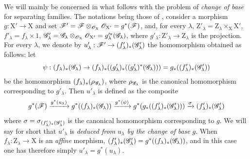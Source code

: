 \begin{env}[11.9.5]
\label{IV.11.9.5}
We will mainly be concerned in what follows with the problem of \emph{change of base} for separating families.
The notations being those of , consider a morphism $g:\mathrm{X}'\to\mathrm{X}$ and set $\mathscr{F}'=\mathscr{F}\otimes_{\mathscr{O}_\mathrm{X}}\mathscr{O}_{\mathrm{X}'}=g^*(\mathscr{F})$, and, for every $\lambda$, $\mathrm{Z}'_\lambda=\mathrm{Z}_\lambda\times_\mathrm{X}\mathrm{X}'$, $f'_\lambda=f_\lambda\times 1$, $\mathscr{G}'_\lambda=\mathscr{G}_\lambda\otimes_{\mathscr{O}_\mathrm{X}}\mathscr{O}_{\mathrm{X}'}=g'^*_\lambda(\mathscr{G}_\lambda)$, where $g'_\lambda:\mathrm{Z}'_\lambda\to\mathrm{Z}_\lambda$ is the projection.
For every $\lambda$, we denote by $u'_\lambda:\mathscr{F}'\to(f'_\lambda)_*(\mathscr{G}'_\lambda)$ the homomorphism obtained as follows: let
\[
  \psi:(f_\lambda)_*(\mathscr{G}_\lambda)\to(f_\lambda)_*((g'_\lambda)_*((g'_\lambda)^*(\mathscr{G}_\lambda)))=g_*((f'_\lambda)_*(\mathscr{G}'_\lambda))
\]
be the homomorphism $(f_\lambda)_*(\rho_{\mathscr{G}_\lambda})$, where $\rho_{\mathscr{G}_\lambda}$ is the canonical homomorphism  corresponding to $g'_\lambda$.
Then $u'_\lambda$ is defined as the composite
\[
  g^*(\mathscr{F})\xrightarrow{g^*(u_\lambda)}g^*((f_\lambda)_*(\mathscr{G}_\lambda))\xrightarrow{g^*(\psi)}g^*(g_*((f'_\lambda)_*(\mathscr{G}'_\lambda)))\xrightarrow{\sigma}(f'_\lambda)_*(\mathscr{G}'_\lambda)
\]
where $\sigma=\sigma_{(f'_\lambda)_*(\mathscr{G}'_\lambda)}$ is the canonical homomorphism  corresponding to $g$.
We will say for short that $u'_\lambda$ is \emph{deduced from $u_\lambda$ by the change of base} $g$.
When $f_\lambda:\mathrm{Z}_\lambda\to\mathrm{X}$ is an \emph{affine} morphism, $(f'_\lambda)_*(\mathscr{G}'_\lambda)=g^*((f_\lambda)_*(\mathscr{G}_\lambda))$, and in this case one has therefore simply $u'_\lambda=g^*(u_\lambda)$.


\end{env}
